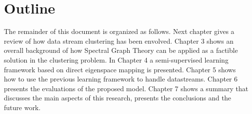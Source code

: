 \section{Outline}
The remainder of this document is organized as follows. Next chapter gives a review of how data stream clustering has been envolved. Chapter 3 shows  an overall background of how Spectral Graph Theory can be applied as a factible solution in the clustering problem. In Chapter 4 a semi-supervised learning framework based on direct eigenspace mapping is presented. Chapter 5 shows how to use the previous learning framework to handle datastreams. Chapter 6 presents the evaluations of the proposed model. Chapter 7 shows a summary that discusses the main aspects of this research, presents the conclusions and the future work.
